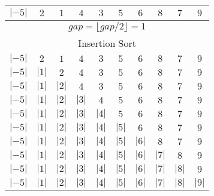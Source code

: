 \documentclass{article}
\begin{document}
\begin{center}
\begin{tabular}{ | c | c | c | c | c | c | c | c | c | c | }
                \hline
                $|-5|$ & $2$ & $1$ & $4$ & $3$ & $5$ & $6$ & $8$ & $7$ & $9$ \\
                \hline
                \multicolumn{10}{|c|}{$gap = \lfloor gap / 2\rfloor = 1$} \\
                \multicolumn{10}{|c|}{Insertion Sort} \\
                \hline
                $|-5|$ & $2$ & $1$ & $4$ & $3$ & $5$ & $6$ & $8$ & $7$ & $9$ \\
                \hline
                $|-5|$ & $|1|$ & $2$ & $4$ & $3$ & $5$ & $6$ & $8$ & $7$ & $9$
                \\
                \hline
                $|-5|$ & $|1|$ & $|2|$ & $4$ & $3$ & $5$ & $6$ & $8$ & $7$ &
                $9$ \\
                \hline
                $|-5|$ & $|1|$ & $|2|$ & $|3|$ & $4$ & $5$ & $6$ & $8$ & $7$ &
                $9$ \\
                \hline
                $|-5|$ & $|1|$ & $|2|$ & $|3|$ & $|4|$ & $5$ & $6$ & $8$ & $7$
                & $9$ \\
                \hline
                $|-5|$ & $|1|$ & $|2|$ & $|3|$ & $|4|$ & $|5|$ & $6$ & $8$ &
                $7$ & $9$ \\
                \hline
                $|-5|$ & $|1|$ & $|2|$ & $|3|$ & $|4|$ & $|5|$ & $|6|$ & $8$ &
                $7$ & $9$ \\
                \hline
                $|-5|$ & $|1|$ & $|2|$ & $|3|$ & $|4|$ & $|5|$ & $|6|$ & $|7|$
                & $8$ & $9$ \\
                \hline
                $|-5|$ & $|1|$ & $|2|$ & $|3|$ & $|4|$ & $|5|$ & $|6|$ & $|7|$
                & $|8|$ & $9$ \\
                \hline
                $|-5|$ & $|1|$ & $|2|$ & $|3|$ & $|4|$ & $|5|$ & $|6|$ & $|7|$
                & $|8|$ & $|9|$ \\
                \hline


                          \end{tabular}
        \end{center}
\end{document}
